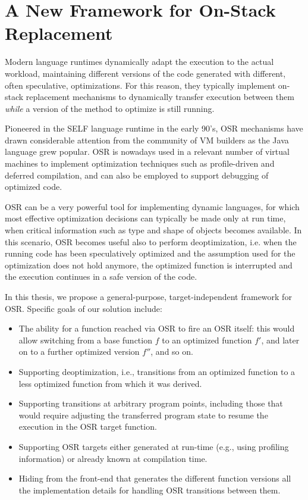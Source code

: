 \section{A New Framework for On-Stack Replacement}

Modern language runtimes dynamically adapt the execution to the actual workload, maintaining different versions of the code generated with different, often speculative, optimizations. For this reason, they typically implement on-stack replacement mechanisms to dynamically transfer execution between them {\em while} a version of the method to optimize is still running.

Pioneered in the SELF language runtime in the early 90's, OSR mechanisms have drawn considerable attention from the community of VM builders as the Java language grew popular. OSR is nowadays used in a relevant number of virtual machines to implement optimization techniques such as profile-driven and deferred compilation, and can also be employed to support debugging of optimized code.

\noindent OSR can be a very powerful tool for implementing dynamic languages, for which most effective optimization decisions can typically be made only at run time, when critical information such as type and shape of objects becomes available. In this scenario, OSR becomes useful also to perform deoptimization, i.e. when the running code has been speculatively optimized and the assumption used for the optimization does not hold anymore, the optimized function is interrupted and the execution continues in a safe version of the code.

In this thesis, we propose a general-purpose, target-independent framework for OSR. Specific goals of our solution include:
\begin{itemize}[parsep=0pt]
\item The ability for a function reached via OSR to fire an OSR itself: this would allow switching from a base function $f$ to an optimized function $f'$, and later on to a further optimized version $f''$, and so on.
\item Supporting deoptimization, i.e., transitions from an optimized function to a less optimized function from which it was derived.
\item Supporting transitions at arbitrary program points, including those that would require adjusting the transferred program state to resume the execution in the OSR target function.
\item Supporting OSR targets either generated at run-time (e.g., using profiling information) or already known at compilation time.
\item Hiding from the front-end that generates the different function versions all the implementation details for handling OSR transitions between them.%
\end{itemize}


